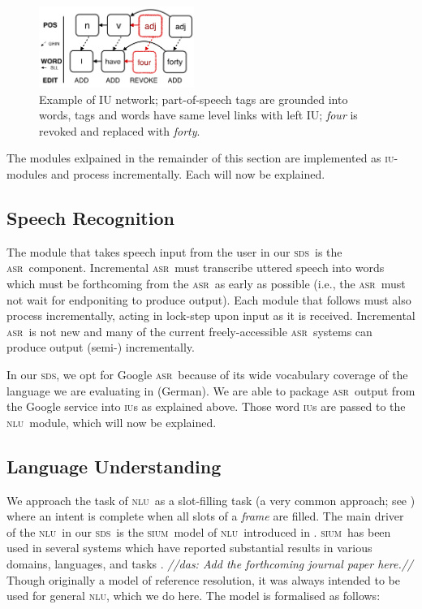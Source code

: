\documentclass[11pt]{article}
\newcommand{\das}[1]{{\color{red}\emph{//das: #1//}}}
\newcommand{\sds}[0]{\textsc{sds}}
\newcommand{\nlu}[0]{\textsc{nlu}}
\newcommand{\sium}[0]{\textsc{sium}}
\newcommand{\asr}[0]{\textsc{asr}}
\newcommand{\iu}[0]{\textsc{iu}}
\begin{document}
\begin{figure} %
  \centering
      \includegraphics[width=0.45\textwidth]{figures/005_iu_example.png}	
      \caption{Example of IU network; part-of-speech tags are grounded into words, tags and words have same level links with left IU; \emph{four} is revoked and replaced with \emph{forty}.\label{fig:iu_example}}
            \vspace{-0.25cm}
\end{figure}

The modules exlpained in the remainder of this section are implemented as \iu-modules and process incrementally. Each will now be explained. 

\subsection{Speech Recognition}

The module that takes speech input from the user in our \sds\ is the \asr\ component. Incremental \asr\ must transcribe uttered speech into words which must be forthcoming from the \asr\ as early as possible (i.e., the \asr\ must not wait for endponiting to produce output). Each module that follows must also process incrementally, acting in lock-step upon input as it is received. Incremental \asr\ is not new \cite{baumannetal2009:naacl} and many of the current freely-accessible \asr\ systems can produce output (semi-) incrementally. 

In our \sds, we opt for Google \asr\ because of its wide vocabulary coverage of the language we are evaluating in (German). We are able to package \asr\ output from the Google service into \iu s as explained above. Those word \iu s are passed to the \nlu\ module, which will now be explained. 

\subsection{Language Understanding}

We approach the task of \nlu\ as a slot-filling task (a very common approach; see ) where an intent is complete when all slots of a \emph{frame} are filled. The main driver of the \nlu\ in our \sds\ is the \sium\ model of \nlu\ introduced in . \sium\ has been used in several systems which have reported substantial results in various domains, languages, and tasks \cite{Kennington2014_coling,Kennington2015_naacl}. \das{Add the forthcoming journal paper here.} Though originally a model of reference resolution, it was always intended to be used for general \nlu, which we do here. The model is formalised as follows:
\end{document}
